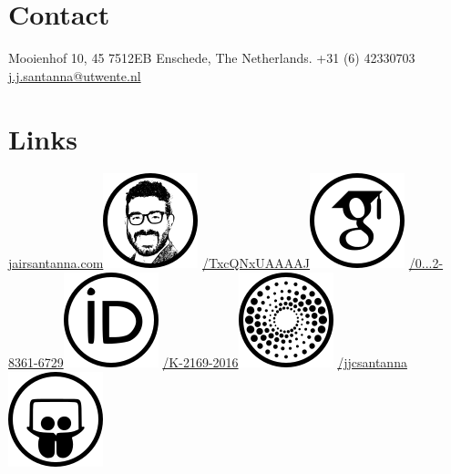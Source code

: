 \documentclass[print]{styles/friggeri-cv-linux} %
\begin{document}

\begin{aside} 
 \section{Contact}
	Mooienhof 10, 45
	7512EB Enschede,
	The Netherlands.
	+31 (6) 42330703
	\href{mailto:j.j.santanna@utwente.nl}{j.j.santanna@utwente.nl}
~
\section{Links}
\hspace{-1cm}\href{http://www.jairsantanna.com}{jairsantanna.com}\includegraphics[scale=0.5]{img/jairsantanna.png}
\href{https://scholar.google.com/citations?user=TxcQNxUAAAAJ}{/TxcQNxUAAAAJ}\includegraphics[scale=0.3]{img/googlescholar.png}
\href{http://orcid.org/0000-0002-8361-6729}{/0...2-8361-6729}\includegraphics[scale=0.3]{img/orcid.png}
\href{http://www.researcherid.com/rid/K-2169-2016}{/K-2169-2016}\includegraphics[scale=0.3]{img/researchid.png}
\href{http://www.slideshare.net/jjcsantanna}{/jjcsantanna}\includegraphics[scale=0.3]{img/slideshare.png}

\end{aside}
\end{document}
